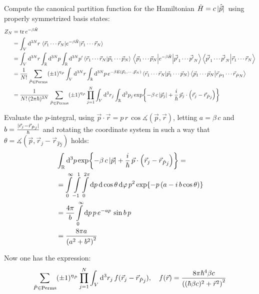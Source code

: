 \documentclass[11pt,a4paper]{scrartcl}
\begin{document}
Compute the canonical partition function for the Hamiltonian
$\hat{H}=c\,\abs*{\hat{\vec{p}}}$ using properly symmetrized basis states:
\begin{align*}
    Z_N &= \tr e^{-\beta\hat{H}} \\
    &=
    \int_{V}\dd[3N]{r}\ev{e^{-\beta\hat{H}}}{\vec{r}_{1}\cdots\vec{r}_{N}} \\
    &= \int_{V}\dd[3N]{r}\int_{\mathbb{R}}\dd[3N]{p}\int_{\mathbb{R}}\dd[3N]{p'}
    \braket{\vec{r}_{1}\cdots\vec{r}_{N}}{\vec{p}_{1}\cdots\vec{p}_{N}}
    \mel{\vec{p}_{1}\cdots\vec{p}_{N}}{e^{-\beta\hat{H}}}{\vec{p'}_{1}\cdots\vec{p'}_{N}}
    \braket{\vec{p'}_{1}\cdots\vec{p'}_{N}}{\vec{r}_{1}\cdots\vec{r}_{N}} \\
    &= \frac{1}{N!}\sum_{\hat{P}\in\mathrm{Perms}}(\pm1)^{\eta_{\hat{P}}}
    \int_{V}\dd[3N]{r}\int_{\mathbb{R}}\dd[3N]{p}e^{-\beta
        E(\vec{p}_{1},\cdots,\vec{p}_{N})}
    \braket{\vec{r}_{1}\cdots\vec{r}_{N}}{\vec{p}_{1}\cdots\vec{p}_{N}}
    \braket{\vec{p}_{1}\cdots\vec{p}_{N}}{\vec{r}_{\hat{P}1}\cdots\vec{r}_{\hat{P}N}}
    \\
    &=
    \frac{1}{N!\,(2\pi\hbar)^{3N}}\sum_{\hat{P}\in\mathrm{Perms}}(\pm1)^{\eta_{\hat{P}}}
    \prod_{j=1}^{N}\int_{V}\dd[3]{r_j}\int_{\mathbb{R}}\dd[3]{p_j}
    \exp{-\beta\,c\,\abs{\vec{p}_j}
    +\frac{i}{\hbar}\,\vec{p}_{j}\cdot\left(\vec{r}_{j}-\vec{r}_{\hat{P}j}\right)}
\end{align*}

Evaluate the $p$-integral, using $\vec{p}\cdot\vec{r}=p\,r\,\cos\measuredangle(\vec{p},
\vec{r})$, letting $a=\beta\,c$ and
$b=\frac{\abs*{\vec{r}_{j}-\vec{r}_{\hat{P}j}}}{\hbar}$ and rotating the
coordinate system in such a way that $\theta=\measuredangle(\vec{p},
\vec{r}_{j}-\vec{r}_{\hat{P}j})$ holds:
\begin{align*}
    &\int_{\mathbb{R}}\dd[3]{p}\exp{-\beta\,c\,\abs{\vec{p}}+\frac{i}{\hbar}\,\vec{p}\cdot\left(\vec{r}_{j}-\vec{r}_{\hat{P}j}\right)}
    =\\&=
    \int\limits_{0}^{\infty}\int\limits_{-1}^{1}\int\limits_{0}^{2\pi}\dd{p}\dd{\cos\theta}\dd{\varphi}
    p^2\exp{-p\left(a-i\,b\cos\theta\right)} \\
    &= \frac{4\pi}{b}\int\limits_{0}^{\infty}\dd{p}p\,e^{-ap}\,\sin b\,p \\
    &= \frac{8\pi a}{\left(a^2+b^2\right)^2}
\end{align*}

Now one has the expression:
\begin{equation*}
    \sum_{\hat{P}\in\mathrm{Perms}}(\pm1)^{\eta_{\hat{P}}}\prod_{j=1}^{N}\int_V\dd[3]{r_j}
    f(\vec{r}_{j}-\vec{r}_{\hat{P}j})\qc
    f(\vec{r})=\frac{8\pi\hbar^4\beta c}{\left((\hbar\beta c)^2+\vec{r}^2\right)^2}
\end{equation*}
\end{document}
